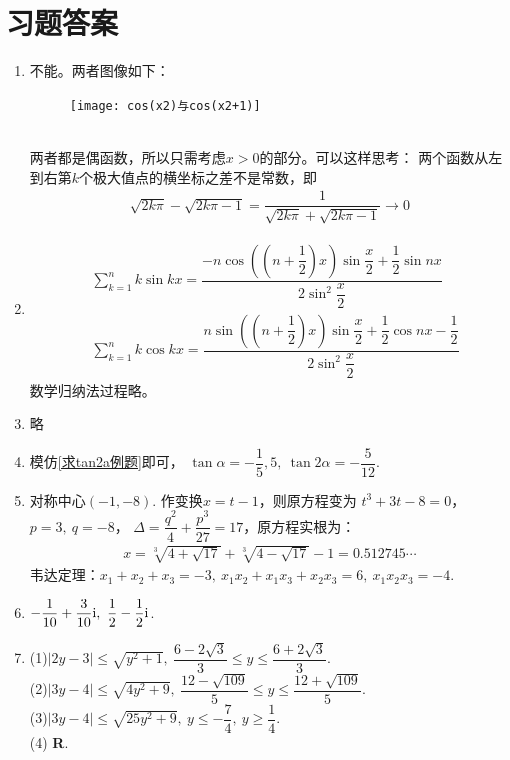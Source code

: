 \section{习题答案}
\begin{enumerate}[label={\textbf{\arabic*.}},leftmargin=
    \inteval{\myenumleftmargin}pt]

\item 不能。两者图像如下：
\begin{figure}[h]
    \centering
    \texttt{[image: cos(x2)与cos(x2+1)]}
\end{figure} \\
两者都是偶函数，所以只需考虑$ x>0 $的部分。可以这样思考：
两个函数从左到右第$ k $个极大值点的横坐标之差不是常数，即
\begin{gather*}
    \sqrt{2k\pi}-\sqrt{2k\pi-1}=\dfrac{1}{\sqrt{2k\pi}+\sqrt{2k\pi-1}}\to 0
\end{gather*}

\item \begin{align*}
    &\sum_{k=1}^{n}k\sin kx=
    \dfrac{-n\cos\left(\left(n+\dfrac{1}{2}\right)x\right)
        \sin\dfrac{x}{2}+\dfrac{1}{2}\sin nx}{2\sin^2 \dfrac{x}{2}} \\
    &\sum_{k=1}^{n}k\cos kx=
   \dfrac{n\sin\left(\left(n+\dfrac{1}{2}\right)x\right)\sin\dfrac{x}{2}
       +\dfrac{1}{2}\cos nx-\dfrac{1}{2}}{2\sin^2\dfrac{x}{2}} 
\end{align*}
数学归纳法过程略。

\item 略

\item 模仿\ref{求tan2a例题}即可，
$ \tan\alpha=-\dfrac{1}{5},5,\ \tan2\alpha=-\dfrac{5}{12} $.  

\item 对称中心$ (-1,-8) $. 作变换$ x=t-1 $，则原方程变为
$ t^3+3t-8=0 $，$ p=3,\ q=-8 $，
$ \Delta=\dfrac{q^2}{4}+\dfrac{p^3}{27}=17 $，原方程实根为：
\begin{align*}
    x =\sqrt[3]{4+\sqrt{17}}+\sqrt[3]{4-\sqrt{17}}-1=0.512745\cdots
\end{align*}
韦达定理：$ x_1+x_2+x_3=-3,\ x_1x_2+x_1x_3+x_2x_3=6,\ x_1x_2x_3=-4 $. 

\item $ -\dfrac{1}{10}+\dfrac{3}{10}\i,\ 
\dfrac{1}{2}-\dfrac{1}{2}\i $. 

\item
(1)$ |2y-3|\leq \sqrt{y^2+1},\ \dfrac{6-2\sqrt{3}}{3}\leq y\leq \dfrac{6+2\sqrt{3}}{3} $. \\
(2)$ |3y-4|\leq \sqrt{4y^2+9},\ \dfrac{12-\sqrt{109}}{5}\leq y\leq \dfrac{12+\sqrt{109}}{5} $. \\
(3)$ |3y-4|\leq \sqrt{25y^2+9},\ y\leq -\dfrac{7}{4},\ y\geq\dfrac{1}{4} $. \\
(4) \textbf{R}.


\end{enumerate}
